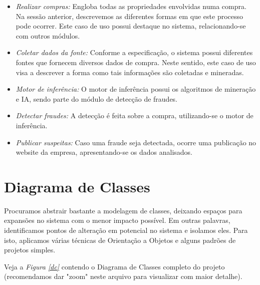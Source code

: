 \documentclass[a4paper,10pt]{article}
\begin{document}
\begin{itemize}
  \item \emph{Realizar compras:} Engloba todas as propriedades envolvidas numa compra.
        Na sessão anterior, descrevemos as diferentes formas em que este processo pode
        ocorrer. Este caso de uso possui destaque no sistema, relacionando-se com
        outros módulos.
  \item \emph{Coletar dados da fonte:} Conforme a especificação, o sistema possui
        diferentes fontes que fornecem diversos dados de compra. Neste sentido,
        este caso de uso visa a descrever a forma como tais informações são coletadas
        e mineradas.
  \item \emph{Motor de inferência:} O motor de inferência possui os algoritmos de
        mineração e IA, sendo parte do módulo de detecção de fraudes.
  \item \emph{Detectar fraudes:} A detecção é feita sobre a compra, utilizando-se o
        motor de inferência.
  \item \emph{Publicar suspeitas:} Caso uma fraude seja detectada, ocorre uma
        publicação no website da empresa, apresentando-se os dados analisados.
\end{itemize}


\newpage
\section{Diagrama de Classes}

Procuramos abstrair bastante a modelagem de classes, deixando espaços para expansões
no sistema com o menor impacto possível. Em outras palavras, identificamos pontos de
alteração em potencial no sistema e isolamos eles. Para isto, aplicamos várias
técnicas de Orientação a Objetos e alguns padrões de projetos simples. \par

Veja a \emph{Figura \ref{dc}} contendo o Diagrama de Classes completo do projeto
(recomendamos dar "zoom" neste arquivo para visualizar com maior detalhe).
\end{document}
